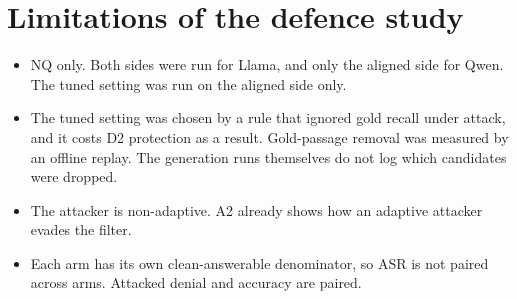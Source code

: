 \section{Limitations of the defence study}
\begin{itemize}
  \item NQ only. Both sides were run for Llama, and only the aligned side
    for Qwen. The tuned setting was run on the aligned side only.
  \item The tuned setting was chosen by a rule that ignored gold recall under
    attack, and it costs D2 protection as a result. Gold-passage removal was
    measured by an offline replay. The generation runs themselves do not log
    which candidates were dropped.
  \item The attacker is non-adaptive. A2 already shows how an adaptive
    attacker evades the filter.
  \item Each arm has its own clean-answerable denominator, so ASR is not
    paired across arms. Attacked denial and accuracy are paired.
\end{itemize}
